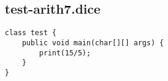 \subsection{test-arith7.dice}
\begin{verbatim}
class test {
	public void main(char[][] args) {
		print(15/5);
	}
}

\end{verbatim}
